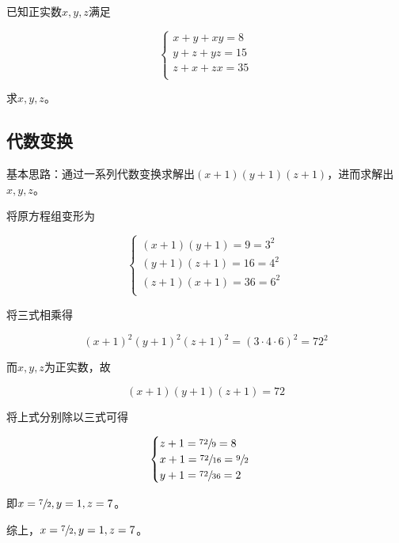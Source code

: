 

已知正实数$x, y, z$满足

\[ \begin{cases}
  x + y + xy = 8 \\
  y + z + yz = 15 \\
  z + x + zx = 35 \\
\end{cases} \]

求$x, y, z$。


\subsection{代数变换}

基本思路：通过一系列代数变换求解出$(x + 1)(y + 1)(z + 1)$，进而求解出$x, y, z$。

将原方程组变形为

\[ \begin{cases}
  (x + 1)(y + 1) = 9 = 3^2 \\
  (y + 1)(z + 1) = 16 = 4^2 \\
  (z + 1)(x + 1) = 36 = 6^2 \\
\end{cases} \]

将三式相乘得

\[ (x + 1)^2(y + 1)^2(z + 1)^2 = (3\cdot4\cdot6)^2 = 72^2 \]

而$x, y, z$为正实数，故

\[ (x + 1)(y + 1)(z + 1) = 72 \]

将上式分别除以三式可得

\[ \begin{cases}
  z + 1 = \sfrac{72}9 = 8 \\
  x + 1 = \sfrac{72}{16} = \sfrac92 \\
  y + 1 = \sfrac{72}{36} = 2 \\
\end{cases} \]

即$x = \sfrac72, y = 1, z = 7$。

综上，$x = \sfrac72, y = 1, z = 7$。

